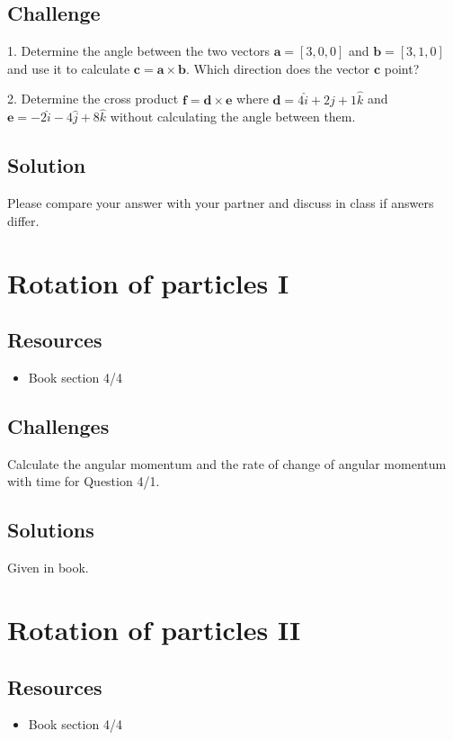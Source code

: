 \subsection*{Challenge}
1. Determine the angle between the two vectors $\bm{a} = [3,0,0]$ and $\bm{b} = [3,1,0]$ and use it to calculate $\bm{c} = \bm{a} \times \bm{b}$. Which direction does the vector $\bm{c}$ point?

2. Determine the cross product $\bm{f} = \bm{d} \times \bm{e}$ where $\bm{d} = 4 \hat{i}+ 2 \hat{j} + 1 \hat{k}$ and $\bm{e} = -2 \hat{i} -4 \hat{j} + 8 \hat{k}$ without calculating the angle between them.

\subsection*{Solution}
Please compare your answer with your partner and discuss in class if answers differ.




\newpage
\section{Rotation of particles I}

\subsection*{Resources}
\begin{itemize}
    \item Book section 4/4
\end{itemize}

\subsection*{Challenges}
Calculate the angular momentum and the rate of change of angular momentum with time for Question 4/1.

\subsection*{Solutions}
Given in book.



\newpage
\section{Rotation of particles II}

\subsection*{Resources}
\begin{itemize}
    \item Book section 4/4
\end{itemize}

